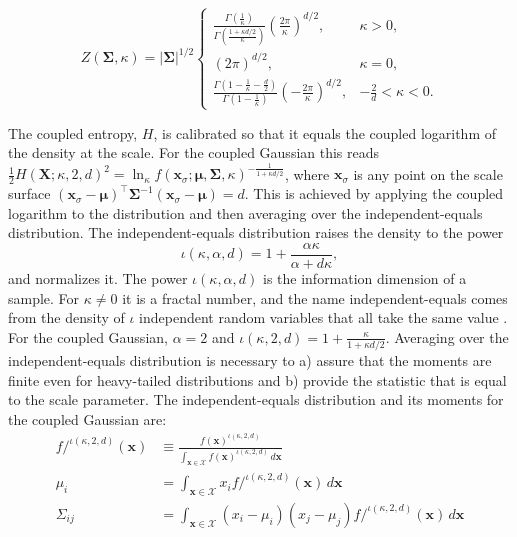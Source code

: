 \documentclass[twoside,11pt]{article}
\begin{document}
\begin{equation}
Z(\boldsymbol{\Sigma}, \kappa)
=|\boldsymbol{\Sigma}|^{1/2}
\begin{cases}
\displaystyle
\frac{\Gamma\left(\frac{1}{\kappa}\right)}
{\Gamma\left(\frac{1+\kappa d/2}{\kappa}\right)}
\left(\frac{2\pi}{\kappa}\right)^{d/2},
& \kappa > 0,
\\[1em]
(2\pi)^{d/2},
& \kappa = 0,
\\[1em]
\displaystyle
\frac{\Gamma\left(1-\frac{1}{\kappa}-\frac{d}{2}\right)}
{\Gamma\left(1-\frac{1}{\kappa}\right)}
\left(-\frac{2\pi}{\kappa}\right)^{d/2},
& -\frac{2}{d} < \kappa < 0.
\end{cases}
\label{partitionFunctionCoupledGaussian}
\end{equation}

The coupled entropy, $H$, is calibrated so that it equals the coupled logarithm of the density at the scale. For the coupled Gaussian this reads $\frac{1}{2}H(\mathbf{X};\kappa,2,d)^2=\ln_{\kappa}f(\mathbf{x}_\sigma;\boldsymbol{\mu},\boldsymbol{\Sigma},\kappa)^{-\frac{1}{1+\kappa d/2}}$, where $\mathbf{x}_\sigma$ is any point on the scale surface $(\mathbf{x}_\sigma-\boldsymbol{\mu})^{\intercal}\boldsymbol{\Sigma}^{-1}(\mathbf{x}_\sigma-\boldsymbol{\mu})=d$. This is achieved by applying the coupled logarithm to the distribution and then averaging over the independent-equals distribution. The independent-equals distribution raises the density to the power
\begin{equation} \label{equ_infoDim}
\iota(\kappa,\alpha,d)=1+\frac{\alpha\kappa}{\alpha+d\kappa},
\end{equation}
and normalizes it. The power $\iota(\kappa,\alpha,d)$ is the information dimension of a sample. For $\kappa\neq0$ it is a fractal number, and the name independent-equals comes from the density of $\iota$ independent random variables that all take the same value \citep{nelsonUniqueUniversalEntropy2026}. For the coupled Gaussian, $\alpha=2$ and $\iota(\kappa,2,d)=1+\frac{\kappa}{1+\kappa d/2}$. Averaging over the independent-equals distribution is necessary to a) assure that the moments are finite even for heavy-tailed distributions and b) provide the statistic that is equal to the scale parameter. The independent-equals distribution and its moments for the coupled Gaussian are:
\begin{align} \label{equ_IE}
    f/^{\iota(\kappa,2,d)}(\mathbf{x}) 
    &\equiv \frac{f(\mathbf{x})^{\iota(\kappa,2,d)}}{\int_{\mathbf{x}\in\mathcal{X}}
    f(\mathbf{x})^{\iota(\kappa,2,d)}
    \,d\mathbf{x}}  \\
    \mu_i &= \int_{\mathbf{x}\in\mathcal{X}}
    x_i f/^{\iota(\kappa,2,d)}(\mathbf{x})
    \,d\mathbf{x} \\
    \Sigma_{ij} &= \int_{\mathbf{x}\in\mathcal{X}}
    (x_i-\mu_i) (x_j-\mu_j)
    f/^{\iota(\kappa,2,d)}(\mathbf{x})
    \,d\mathbf{x}
\end{align}
\end{document}
